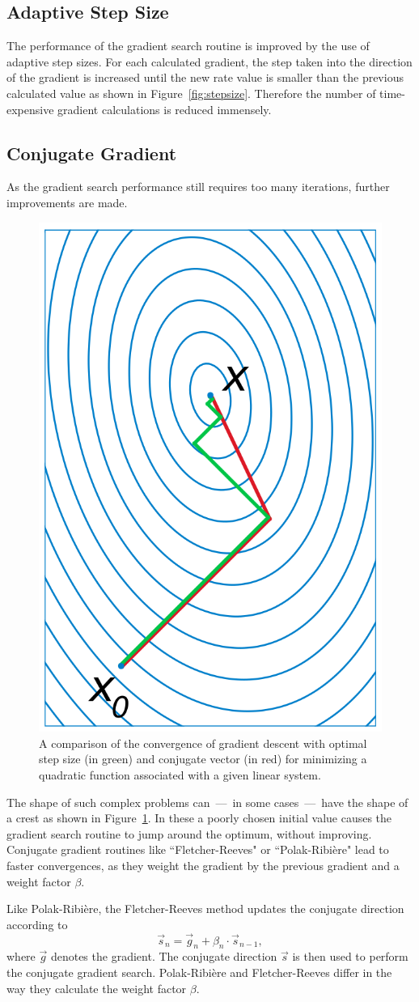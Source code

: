 \subsection{Adaptive Step Size}
\label{sec:grads_stepsize}
The performance of the gradient search routine is improved by the use of adaptive step sizes.
For each calculated gradient, the step taken into the direction of the gradient is increased until the new rate value is smaller than the previous calculated value as shown in Figure~\ref{fig:stepsize}.
Therefore the number of time-expensive gradient calculations is reduced immensely.

\subsection{Conjugate Gradient}
\label{sec:grads_conjgrad}

As the gradient search performance still requires too many iterations, further improvements are made.
\begin{figure}[h]
\centering
\includegraphics[width=0.25\linewidth]{images/conjugate_gradient_example.png}
\caption{A comparison of the convergence of gradient descent with optimal step size (in green) and conjugate vector (in red) for minimizing a quadratic function associated with a given linear system\cite{wiki:conj_grad}.}
\label{fig:conj_grad_ex}
\end{figure}
The shape of such complex problems can~---~in some cases~---~have the shape of a crest as shown in Figure~\ref{fig:conj_grad_ex}.
In these a poorly chosen initial value causes the gradient search routine to jump around the optimum, without improving.
Conjugate gradient routines like ``Fletcher-Reeves" or ``Polak-Ribi\`{e}re" lead to faster convergences, as they weight the gradient by the previous gradient and a weight factor $\beta$. 

Like Polak-Ribi\`{e}re, the Fletcher-Reeves method updates the conjugate direction according to 
\begin{equation}
\vec{s}_n = \vec{g}_n + \beta_n\cdot\vec{s}_{n-1},
\label{eq:conj_update}
\end{equation}
where $\vec{g}$ denotes the gradient.
The conjugate direction $\vec{s}$ is then used to perform the conjugate gradient search.
Polak-Ribi\`{e}re and Fletcher-Reeves differ in the way they calculate the weight factor $\beta$.

